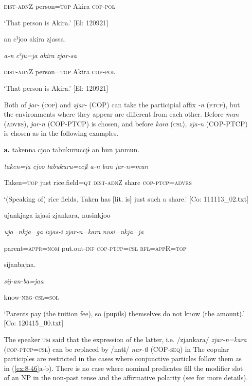       \textsc{dist}-\textsc{adn}Z  person=\textsc{top}  Akira  \textsc{cop}-\textsc{pol}

\glt ‘That person is Akira.’ [El: 120921]

\ex  {\TM}
\glll  an  cˀjoo  akira  zjassa.

      \textit{a-n}  \textit{cˀju=ja}  \textit{akira}  \textit{zjar-sa}

      \textsc{dist}-\textsc{adn}Z  person=\textsc{top}  Akira  \textsc{cop}-\textsc{pol}

\glt ‘That person is Akira.’ [El: 120921]

Both of \textit{jar-} (\textsc{cop}) and \textit{zjar-} (COP) can take the participial affix \textit{{}-n} (\textsc{ptcp}), but the environments where they appear are different from each other. Before \textit{mun} (\textsc{advrs}), \textit{jar-n} (COP-PTCP) is chosen, and before \textit{kara} (\textsc{csl}), \textit{zja-n} (COP-PTCP) is chosen as in the following examples.

\textbf{\ea\label{ex:8-46}
}  \textbf{a.}  {\TM}
\glll  takenna  cjoo  tabukuruccjɨ  an  bun  janmun.

      \textit{taken=ja}  \textit{cjoo}  \textit{tabukuru=ccjɨ}  \textit{a-n}  \textit{bun}  \textit{jar-n=mun}

      Taken=\textsc{top}  just  rice.field=\textsc{qt}  \textsc{dist}-\textsc{adn}Z  share  \textsc{cop}-\textsc{ptcp}=\textsc{advrs}

\glt ‘(Speaking of) rice fields, Taken has [lit. is] just such a share.’ [Co: 111113\_02.txt]
\z

\ex  {\TM}
\glll  ujankjaga  izjasi  zjankara,  nusinkjoo

      \textit{uja=nkja=ga}  \textit{izjas-i}  \textit{zjar-n=kara}  \textit{nusi=nkja=ja}

      parent=\textsc{appr}=\textsc{nom}  put.out-\textsc{inf}  \textsc{cop}-\textsc{ptcp}=\textsc{csl}  \textsc{rfl}=\textsc{app}R=\textsc{top}

      sijanbajaa.

      \textit{sij-an-ba=jaa}

      know-\textsc{neg}-\textsc{csl}=\textsc{sol}

\glt ‘Parents pay (the tuition fee), so (pupils) themselves do not know (the amount).’ [Co: 120415\_00.txt]
\z

The speaker \textsc{tm} said that the expression of the latter, i.e. /zjankara/ \textit{zjar-n=kara} (\textsc{cop}-\textsc{ptcp}=\textsc{csl}) can be replaced by /natɨ/ \textit{nar-tɨ} (COP-\textsc{seq}) in  The copular participles are restricted in the cases where conjunctive particles follow them as in (\ref{ex:8-46}a-b). There is no case where nominal predicates fill the modifier slot of an NP in the non-past tense and the affirmative polarity (see  for more details).

